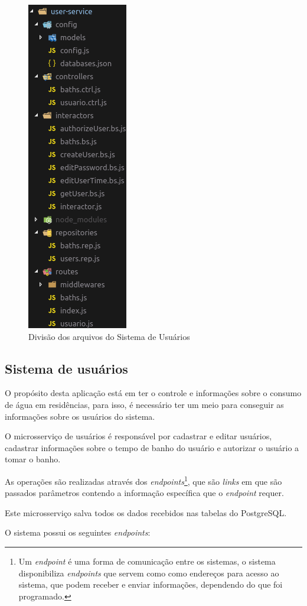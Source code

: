 \begin{figure}[htbp]
	\centering
	\includegraphics[width=0.25\linewidth]{figuras/cleanarch.png}
	\caption{Divisão dos arquivos do Sistema de Usuários}
	\label{fig:clean}
\end{figure}

\subsection{Sistema de usuários}

O propósito desta aplicação está em ter o controle e informações sobre o consumo de água em residências, para isso, é necessário ter um meio para conseguir as informações sobre os usuários do sistema. 

O microsserviço de usuários é responsável por cadastrar e editar usuários, cadastrar informações sobre o tempo de banho do usuário e autorizar o usuário a tomar o banho.

As operações são realizadas através dos \textit{endpoints}\footnote{Um \textit{endpoint} é uma forma de comunicação entre os sistemas, o sistema disponibiliza \textit{endpoints} que servem como como endereços para acesso ao sistema, que podem receber e enviar informações, dependendo do que foi programado.}, que são \textit{links} em que são passados parâmetros contendo a informação específica que o \textit{endpoint} requer.

Este microsserviço salva todos os dados recebidos nas tabelas do PostgreSQL.

O sistema possui os seguintes \textit{endpoints}:


